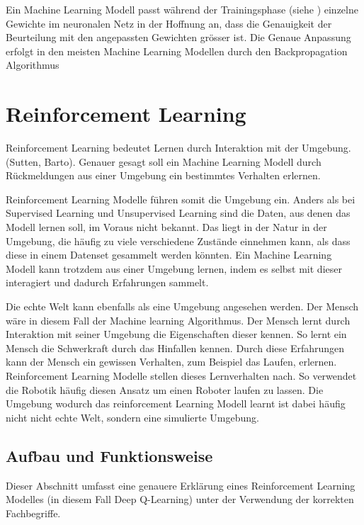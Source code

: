 Ein Machine Learning Modell passt während der Trainingsphase (siehe
) einzelne Gewichte im neuronalen Netz in der
Hoffnung an, dass die Genauigkeit der Beurteilung mit den angepassten Gewichten
grösser ist. Die Genaue Anpassung erfolgt in den meisten Machine Learning
Modellen durch den Backpropagation Algorithmus



\section{Reinforcement Learning}
\label{chap:t_rl}
Reinforcement Learning bedeutet Lernen durch Interaktion mit der Umgebung.
(Sutten, Barto). Genauer gesagt soll ein Machine Learning Modell durch
Rückmeldungen aus einer Umgebung ein bestimmtes Verhalten erlernen.

Reinforcement Learning Modelle führen somit die Umgebung ein. Anders als bei
Supervised Learning und Unsupervised Learning sind die Daten, aus denen das
Modell lernen soll, im Voraus nicht bekannt. Das liegt in der Natur in der
Umgebung, die häufig zu viele verschiedene Zustände einnehmen kann, als dass
diese in einem Datenset gesammelt werden könnten. Ein Machine Learning Modell
kann trotzdem aus einer Umgebung lernen, indem es selbst mit dieser interagiert
und dadurch Erfahrungen sammelt. 

Die echte Welt kann ebenfalls als eine Umgebung angesehen werden. Der Mensch
wäre in diesem Fall der Machine learning Algorithmus. Der Mensch lernt durch
Interaktion mit seiner Umgebung die Eigenschaften dieser kennen. So lernt ein
Mensch die Schwerkraft durch das Hinfallen kennen. Durch diese Erfahrungen kann
der Mensch ein gewissen Verhalten, zum Beispiel das Laufen, erlernen.
Reinforcement Learning Modelle stellen dieses Lernverhalten nach. So verwendet
die Robotik häufig diesen Ansatz um einen Roboter laufen zu lassen. Die Umgebung
wodurch das reinforcement Learning Modell learnt ist dabei häufig nicht nicht
echte Welt, sondern eine simulierte Umgebung.


\subsection*{Aufbau und Funktionsweise}
Dieser Abschnitt umfasst eine genauere Erklärung eines Reinforcement Learning
Modelles (in diesem Fall Deep Q-Learning) unter der Verwendung der korrekten
Fachbegriffe.

